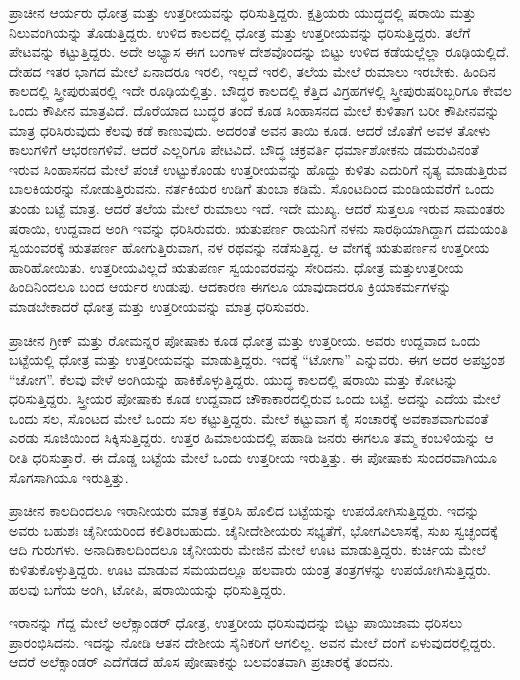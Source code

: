 ಪ್ರಾಚೀನ ಆರ್ಯರು ಧೋತ್ರ ಮತ್ತು ಉತ್ತರೀಯವನ್ನು ಧರಿಸುತ್ತಿದ್ದರು. ಕ್ಷತ್ರಿಯರು ಯುದ್ಧದಲ್ಲಿ ಷರಾಯಿ ಮತ್ತು ನಿಲುವಂಗಿಯನ್ನು ತೊಡುತ್ತಿದ್ದರು. ಉಳಿದ ಕಾಲದಲ್ಲಿ ಧೋತ್ರ ಮತ್ತು ಉತ್ತರೀಯವನ್ನು ಧರಿಸುತ್ತಿದ್ದರು. ತಲೆಗೆ ಪೇಟವನ್ನು ಕಟ್ಟುತ್ತಿದ್ದರು. ಅದೇ ಅಭ್ಯಾಸ ಈಗ ಬಂಗಾಳ ದೇಶವೊಂದನ್ನು ಬಿಟ್ಟು ಉಳಿದ ಕಡೆಯಲ್ಲೆಲ್ಲಾ ರೂಢಿಯಲ್ಲಿದೆ. ದೇಹದ ಇತರ ಭಾಗದ ಮೇಲೆ ಏನಾದರೂ ಇರಲಿ, ಇಲ್ಲದೆ ಇರಲಿ, ತಲೆಯ ಮೇಲೆ ರುಮಾಲು ಇರಬೇಕು. ಹಿಂದಿನ ಕಾಲದಲ್ಲಿ ಸ್ತ್ರೀಪುರುಷರಲ್ಲಿ ಇದೇ ರೂಢಿಯಲ್ಲಿತ್ತು. ಬೌದ್ಧರ ಕಾಲದಲ್ಲಿ ಕೆತ್ತಿದ ವಿಗ್ರಹಗಳಲ್ಲಿ ಸ್ತ್ರೀಪುರುಷರಿಬ್ಬರಿಗೂ ಕೇವಲ ಒಂದು ಕೌಪೀನ ಮಾತ್ರವಿದೆ. ದೊರೆಯಾದ ಬುದ್ಧರ ತಂದೆ ಕೂಡ ಸಿಂಹಾಸನದ ಮೇಲೆ ಕುಳಿತಾಗ ಬರೀ ಕೌಪೀನವನ್ನು ಮಾತ್ರ ಧರಿಸಿರುವುದು ಕೆಲವು ಕಡೆ ಕಾಣುವುದು. ಅದರಂತೆ ಅವನ ತಾಯಿ ಕೂಡ. ಆದರೆ ಜೊತೆಗೆ ಅವಳ ತೋಳು ಕಾಲುಗಳಿಗೆ ಆಭರಣಗಳಿವೆ. ಆದರೆ ಎಲ್ಲರಿಗೂ ಪೇಟವಿದೆ. ಬೌದ್ಧ ಚಕ್ರವರ್ತಿ ಧರ್ಮಾಶೋಕನು ಡಮರುವಿನಂತೆ ಇರುವ ಸಿಂಹಾಸನದ ಮೇಲೆ ಪಂಚೆ ಉಟ್ಟುಕೊಂಡು ಉತ್ತರೀಯವನ್ನು ಹೊದ್ದು ಕುಳಿತು ಎದುರಿಗೆ ನೃತ್ಯ ಮಾಡುತ್ತಿರುವ ಬಾಲಕಿಯರನ್ನು ನೋಡುತ್ತಿರುವನು. ನರ್ತಕಿಯರ ಉಡಿಗೆ ತುಂಬಾ ಕಡಿಮೆ. ಸೊಂಟದಿಂದ ಮಂಡಿಯವರೆಗೆ ಒಂದು ತುಂಡು ಬಟ್ಟೆ ಮಾತ್ರ. ಆದರೆ ತಲೆಯ ಮೇಲೆ ರುಮಾಲು ಇದೆ. ಇದೇ ಮುಖ್ಯ. ಆದರೆ ಸುತ್ತಲೂ ಇರುವ ಸಾಮಂತರು ಷರಾಯಿ, ಉದ್ದವಾದ ಅಂಗಿ ಇವನ್ನು ಧರಿಸಿರುವರು. ಋತುಪರ್ಣ ರಾಯನಿಗೆ ನಳನು ಸಾರಥಿಯಾಗಿದ್ದಾಗ ದಮಯಂತಿ ಸ್ವಯಂವರಕ್ಕೆ ಋತಪರ್ಣ ಹೋಗುತ್ತಿರುವಾಗ, ನಳ ರಥವನ್ನು ನಡೆಸುತ್ತಿದ್ದ. ಆ ವೇಗಕ್ಕೆ ಋತುಪರ್ಣನ ಉತ್ತರೀಯ ಹಾರಿಹೋಯಿತು. ಉತ್ತರೀಯವಿಲ್ಲದೆ ಋತುಪರ್ಣ ಸ್ವಯಂವರವನ್ನು ಸೇರಿದನು. ಧೋತ್ರ ಮತ್ತು\break ಉತ್ತರೀಯ ಹಿಂದಿನಿಂದಲೂ ಬಂದ ಆರ್ಯರ ಉಡುಪು. ಆದಕಾರಣ ಈಗಲೂ ಯಾವುದಾದರೂ ಕ್ರಿಯಾಕರ್ಮಗಳನ್ನು ಮಾಡಬೇಕಾದರೆ ಧೋತ್ರ ಮತ್ತು ಉತ್ತರೀಯವನ್ನು ಮಾತ್ರ ಧರಿಸುವರು.

ಪ್ರಾಚೀನ ಗ್ರೀಕ್​ ಮತ್ತು ರೋಮನ್ನರ ಪೋಷಾಕು ಕೂಡ ಧೋತ್ರ ಮತ್ತು ಉತ್ತರೀಯ. ಅವರು ಉದ್ದವಾದ ಒಂದು ಬಟ್ಟೆಯಲ್ಲಿ ಧೋತ್ರ ಮತ್ತು ಉತ್ತರೀಯವನ್ನು ಮಾಡುತ್ತಿದ್ದರು. ಇದಕ್ಕೆ “ಟೋಗಾ” ಎನ್ನುವರು. ಈಗ ಅದರ ಅಪಭ್ರಂಶ “ಚೋಗ”. ಕೆಲವು ವೇಳೆ ಅಂಗಿಯನ್ನು ಹಾಕಿಕೊಳ್ಳುತ್ತಿದ್ದರು. ಯುದ್ಧ ಕಾಲದಲ್ಲಿ ಷರಾಯಿ ಮತ್ತು ಕೋಟನ್ನು ಧರಿಸುತ್ತಿದ್ದರು. ಸ್ತ್ರೀಯರ ಪೋಷಾಕು ಕೂಡ ಉದ್ದವಾದ ಚೌಕಾಕಾರದಲ್ಲಿರುವ ಒಂದು ಬಟ್ಟೆ. ಅದನ್ನು ಎದೆಯ ಮೇಲೆ ಒಂದು ಸಲ, ಸೊಂಟದ ಮೇಲೆ ಒಂದು ಸಲ ಕಟ್ಟುತ್ತಿದ್ದರು. ಮೇಲೆ ಕಟ್ಟುವಾಗ ಕೈ ಸಂಚಾರಕ್ಕೆ ಅವಕಾಶವಾಗುವಂತೆ ಎರಡು ಸೂಜಿಯಿಂದ ಸಿಕ್ಕಿಸುತ್ತಿದ್ದರು. ಉತ್ತರ ಹಿಮಾಲಯದಲ್ಲಿ ಪಹಾಡಿ ಜನರು ಈಗಲೂ ತಮ್ಮ ಕಂಬಳಿಯನ್ನು ಆ ರೀತಿ ಧರಿಸುತ್ತಾರೆ. ಈ ದೊಡ್ಡ ಬಟ್ಟೆಯ ಮೇಲೆ ಒಂದು ಉತ್ತರೀಯ ಇರುತ್ತಿತ್ತು. ಈ ಪೋಷಾಕು ಸುಂದರವಾಗಿಯೂ ಸೊಗಸಾಗಿಯೂ ಇರುತ್ತಿತ್ತು.

ಪ್ರಾಚೀನ ಕಾಲದಿಂದಲೂ ಇರಾನೀಯರು ಮಾತ್ರ ಕತ್ತರಿಸಿ ಹೊಲಿದ ಬಟ್ಟೆಯನ್ನು ಉಪಯೋಗಿಸುತ್ತಿದ್ದರು. ಇದನ್ನು ಅವರು ಬಹುಶಃ ಚೈನೀಯರಿಂದ ಕಲಿತಿರಬಹುದು. ಚೈನೀದೇಶೀಯರು ಸಭ್ಯತೆಗೆ, ಭೋಗವಿಲಾಸಕ್ಕೆ, ಸುಖ ಸ್ವಚ್ಛಂದಕ್ಕೆ ಆದಿ ಗುರುಗಳು. ಅನಾದಿಕಾಲದಿಂದಲೂ ಚೈನೀಯರು ಮೇಜಿನ ಮೇಲೆ ಊಟ ಮಾಡುತ್ತಿದ್ದರು. ಕುರ್ಚಿಯ ಮೇಲೆ ಕುಳಿತುಕೊಳ್ಳುತ್ತಿದ್ದರು. ಊಟ ಮಾಡುವ ಸಮಯದಲ್ಲೂ ಹಲವಾರು ಯಂತ್ರ ತಂತ್ರಗಳನ್ನು ಉಪಯೋಗಿಸುತ್ತಿದ್ದರು. ಹಲವು ಬಗೆಯ ಅಂಗಿ, ಟೋಪಿ, ಷರಾಯಿಯನ್ನು ಧರಿಸುತ್ತಿದ್ದರು.

ಇರಾನನ್ನು ಗೆದ್ದ ಮೇಲೆ ಅಲೆಕ್ಸಾಂಡರ್​ ಧೋತ್ರ, ಉತ್ತರೀಯ ಧರಿಸುವುದನ್ನು ಬಿಟ್ಟು ಪಾಯಿಜಾಮ ಧರಿಸಲು ಪ್ರಾರಂಭಿಸಿದನು. ಇದನ್ನು ನೋಡಿ ಆತನ ದೇಶೀಯ ಸೈನಿಕರಿಗೆ ಆಗಲಿಲ್ಲ. ಅವನ ಮೇಲೆ ದಂಗೆ ಏಳುವುದರಲ್ಲಿದ್ದರು. ಆದರೆ ಅಲೆಕ್ಸಾಂಡರ್​ ಎದೆಗೆಡದೆ ಹೊಸ ಪೋಷಾಕನ್ನು ಬಲವಂತವಾಗಿ ಪ್ರಚಾರಕ್ಕೆ ತಂದನು.

